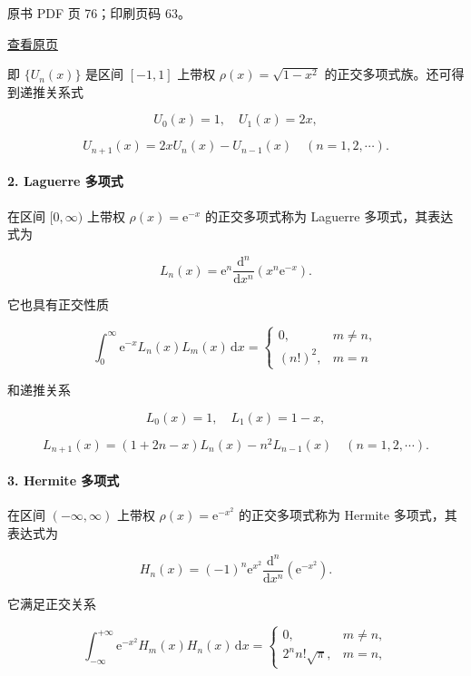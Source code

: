 \clearpage

原书 PDF 页 76；印刷页码 63。

\href{source-images/pdf-076.jpeg}{查看原页}

即 \(\{U_n(x)\}\) 是区间 \([-1,1]\) 上带权 \(\rho(x)=\sqrt{1-x^2}\) 的正交多项式族。还可得到递推关系式

\[
U_0(x)=1,\quad U_1(x)=2x,
\]

\[
U_{n+1}(x)=2xU_n(x)-U_{n-1}(x)\quad(n=1,2,\cdots).
\]

\paragraph{2. Laguerre 多项式}\label{ch03b-laguerre-ux591aux9879ux5f0f}

在区间 \([0,\infty)\) 上带权 \(\rho(x)=\mathrm e^{-x}\) 的正交多项式称为 Laguerre 多项式，其表达式为

\[
L_n(x)=\mathrm e^n\frac{\mathrm d^n}{\mathrm dx^n}(x^n\mathrm e^{-x}).\tag{3.4.11}
\]

它也具有正交性质

\[
\int_0^\infty \mathrm e^{-x}L_n(x)L_m(x)\,\mathrm dx=
\begin{cases}
0,&m\ne n,\\
(n!)^2,&m=n
\end{cases}
\]

和递推关系

\[
L_0(x)=1,\quad L_1(x)=1-x,
\]

\[
L_{n+1}(x)=(1+2n-x)L_n(x)-n^2L_{n-1}(x)\quad(n=1,2,\cdots).
\]

\paragraph{3. Hermite 多项式}\label{ch03b-hermite-ux591aux9879ux5f0f}

在区间 \((-\infty,\infty)\) 上带权 \(\rho(x)=\mathrm e^{-x^2}\) 的正交多项式称为 Hermite 多项式，其表达式为

\[
H_n(x)=(-1)^n\mathrm e^{x^2}\frac{\mathrm d^n}{\mathrm dx^n}(\mathrm e^{-x^2}).\tag{3.4.12}
\]

它满足正交关系

\[
\int_{-\infty}^{+\infty}\mathrm e^{-x^2}H_m(x)H_n(x)\,\mathrm dx=
\begin{cases}
0,&m\ne n,\\
2^nn!\sqrt\pi,&m=n,
\end{cases}
\]


